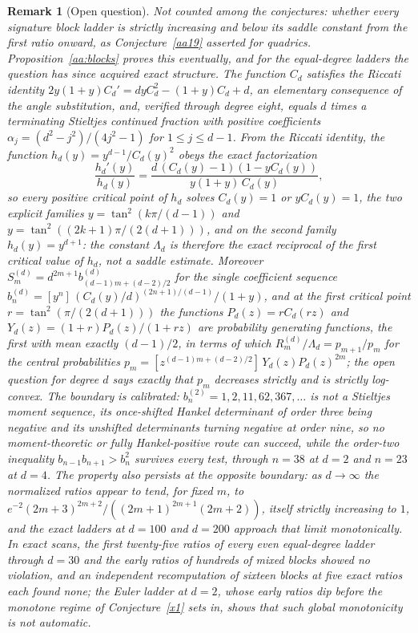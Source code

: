 \documentclass[11pt]{article}
\newtheorem{remark}{Remark}
\theoremstyle{definition}
\begin{document}
\begin{remark}[Open question]\label{aa:blocksopen}
Not counted among the conjectures: whether every signature block ladder is strictly increasing and below its saddle constant from the first ratio onward, as Conjecture~\ref{aa19} asserted for quadrics.  Proposition~\ref{aa:blocks} proves this eventually, and for the equal-degree ladders the question has since acquired exact structure.  The function $C_d$ satisfies the Riccati identity $2y(1+y)C_d'=dyC_d^2-(1+y)C_d+d$, an elementary consequence of the angle substitution, and, verified through degree eight, equals $d$ times a terminating Stieltjes continued fraction with positive coefficients $\alpha_j=(d^2-j^2)/(4j^2-1)$ for $1\le j\le d-1$.  From the Riccati identity, the function $h_d(y)=y^{d-1}/C_d(y)^2$ obeys the exact factorization
\[
\frac{h_d'(y)}{h_d(y)}=\frac{d\,(C_d(y)-1)(1-yC_d(y))}{y(1+y)\,C_d(y)},
\]
so every positive critical point of $h_d$ solves $C_d(y)=1$ or $yC_d(y)=1$, the two explicit families $y=\tan^2(k\pi/(d-1))$ and $y=\tan^2((2k+1)\pi/(2(d+1)))$, and on the second family $h_d(y)=y^{d+1}$: the constant $\Lambda_d$ is therefore the exact reciprocal of the first critical value of $h_d$, not a saddle estimate.  Moreover $S^{(d)}_m=d^{2m+1}b^{(d)}_{(d-1)m+(d-2)/2}$ for the single coefficient sequence $b^{(d)}_n=[y^n]\,(C_d(y)/d)^{(2n+1)/(d-1)}/(1+y)$, and at the first critical point $r=\tan^2(\pi/(2(d+1)))$ the functions $P_d(z)=rC_d(rz)$ and $Y_d(z)=(1+r)P_d(z)/(1+rz)$ are probability generating functions, the first with mean exactly $(d-1)/2$, in terms of which $R^{(d)}_m/\Lambda_d=p_{m+1}/p_m$ for the central probabilities $p_m=[z^{(d-1)m+(d-2)/2}]\,Y_d(z)P_d(z)^{2m}$; the open question for degree $d$ says exactly that $p_m$ decreases strictly and is strictly log-convex.  The boundary is calibrated: $b^{(2)}_n=1,2,11,62,367,\ldots$ is not a Stieltjes moment sequence, its once-shifted Hankel determinant of order three being negative and its unshifted determinants turning negative at order nine, so no moment-theoretic or fully Hankel-positive route can succeed, while the order-two inequality $b_{n-1}b_{n+1}>b_n^2$ survives every test, through $n=38$ at $d=2$ and $n=23$ at $d=4$.  The property also persists at the opposite boundary: as $d\to\infty$ the normalized ratios appear to tend, for fixed $m$, to $e^{-2}(2m+3)^{2m+2}/((2m+1)^{2m+1}(2m+2))$, itself strictly increasing to $1$, and the exact ladders at $d=100$ and $d=200$ approach that limit monotonically.  In exact scans, the first twenty-five ratios of every even equal-degree ladder through $d=30$ and the early ratios of hundreds of mixed blocks showed no violation, and an independent recomputation of sixteen blocks at five exact ratios each found none; the Euler ladder at $d=2$, whose early ratios dip before the monotone regime of Conjecture~\ref{x1} sets in, shows that such global monotonicity is not automatic.
\end{remark}
\end{document}
